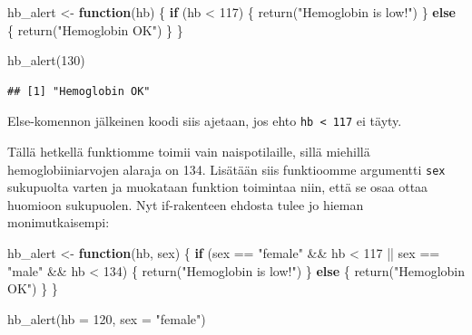 \documentclass[
]{book}
\newenvironment{Shaded}{\begin{snugshade}}{\end{snugshade}}
\newcommand{\AttributeTok}[1]{\textcolor[rgb]{0.77,0.63,0.00}{#1}}
\newcommand{\ControlFlowTok}[1]{\textcolor[rgb]{0.13,0.29,0.53}{\textbf{#1}}}
\newcommand{\DecValTok}[1]{\textcolor[rgb]{0.00,0.00,0.81}{#1}}
\newcommand{\FunctionTok}[1]{\textcolor[rgb]{0.00,0.00,0.00}{#1}}
\newcommand{\NormalTok}[1]{#1}
\newcommand{\OtherTok}[1]{\textcolor[rgb]{0.56,0.35,0.01}{#1}}
\newcommand{\SpecialCharTok}[1]{\textcolor[rgb]{0.00,0.00,0.00}{#1}}
\newcommand{\StringTok}[1]{\textcolor[rgb]{0.31,0.60,0.02}{#1}}
\begin{document}
\begin{Shaded}
\begin{Highlighting}[]
\NormalTok{hb\_alert }\OtherTok{\textless{}{-}} \ControlFlowTok{function}\NormalTok{(hb) \{}
  \ControlFlowTok{if}\NormalTok{ (hb }\SpecialCharTok{\textless{}} \DecValTok{117}\NormalTok{) \{}
    \FunctionTok{return}\NormalTok{(}\StringTok{"Hemoglobin is low!"}\NormalTok{)}
\NormalTok{  \} }\ControlFlowTok{else}\NormalTok{ \{}
    \FunctionTok{return}\NormalTok{(}\StringTok{"Hemoglobin OK"}\NormalTok{)}
\NormalTok{  \}}
\NormalTok{\}}

\FunctionTok{hb\_alert}\NormalTok{(}\DecValTok{130}\NormalTok{)}
\end{Highlighting}
\end{Shaded}

\begin{verbatim}
## [1] "Hemoglobin OK"
\end{verbatim}

Else-komennon jälkeinen koodi siis ajetaan, jos ehto \texttt{hb\ \textless{}\ 117} ei täyty.

Tällä hetkellä funktiomme toimii vain naispotilaille, sillä miehillä hemoglobiiniarvojen alaraja on 134. Lisätään siis funktioomme argumentti \texttt{sex} sukupuolta varten ja muokataan funktion toimintaa niin, että se osaa ottaa huomioon sukupuolen. Nyt if-rakenteen ehdosta tulee jo hieman monimutkaisempi:

\begin{Shaded}
\begin{Highlighting}[]
\NormalTok{hb\_alert }\OtherTok{\textless{}{-}} \ControlFlowTok{function}\NormalTok{(hb, sex) \{}
  \ControlFlowTok{if}\NormalTok{ (sex }\SpecialCharTok{==} \StringTok{"female"} \SpecialCharTok{\&\&}\NormalTok{ hb }\SpecialCharTok{\textless{}} \DecValTok{117} \SpecialCharTok{||}\NormalTok{ sex }\SpecialCharTok{==} \StringTok{"male"} \SpecialCharTok{\&\&}\NormalTok{ hb }\SpecialCharTok{\textless{}} \DecValTok{134}\NormalTok{) \{}
    \FunctionTok{return}\NormalTok{(}\StringTok{"Hemoglobin is low!"}\NormalTok{)}
\NormalTok{  \} }\ControlFlowTok{else}\NormalTok{ \{}
    \FunctionTok{return}\NormalTok{(}\StringTok{"Hemoglobin OK"}\NormalTok{)}
\NormalTok{  \}}
\NormalTok{\}}

\FunctionTok{hb\_alert}\NormalTok{(}\AttributeTok{hb =} \DecValTok{120}\NormalTok{, }\AttributeTok{sex =} \StringTok{"female"}\NormalTok{)}
\end{Highlighting}
\end{Shaded}
\end{document}
